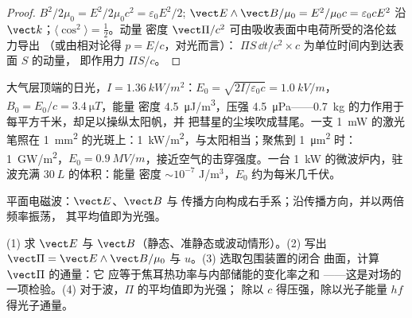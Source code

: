 \begin{proof}
$B^2/2\mu_0 = E^2/2\mu_0c^2 = \varepsilon_0E^2/2$; $\vect E\wedge\vect B/\mu_0 = E^2/\mu_0c =
\varepsilon_0cE^2$ 沿 $\vect k$；$\langle\cos^2\rangle = \tfrac12$。动量
密度 $\vect\Pi/c^2$ 可由吸收表面中电荷所受的洛伦兹力导出
（或由相对论得 $p = E/c$，对光而言）：
$\Pi S\,\dd t/c^2\times c$ 为单位时间内到达表面 $S$ 的动量，
即作用力 $\Pi S/c$。
\end{proof}

\begin{example}[日光、激光与微波]\label{ex:b2:poynting-vector:orders}
大气层顶端的日光，$I = \qty{1.36}{kW/m^2}$：$E_0 =
\sqrt{2I/\varepsilon_0c} = \qty{1.0}{kV/m}$，$B_0 = E_0/c = \qty{3.4}{\micro T}$，能量
密度 \qty{4.5}{\micro J/m^3}，压强 \qty{4.5}{\micro Pa}——\qty{0.7}{kg}
的力作用于每平方千米，却足以操纵太阳帆，并
把彗星的尘埃吹成彗尾。一支 \qty{1}{mW} 的激光笔照在
\qty{1}{mm^2} 的光斑上：\qty{1}{kW/m^2}，与太阳相当；聚焦到 \qty{1}{\micro m^2} 时：
\qty{1}{GW/m^2}，$E_0 = \qty{0.9}{MV/m}$，接近空气的击穿强度。一台
\qty{1}{kW} 的微波炉内，驻波充满 $\qty{30}{L}$ 的体积：能量
密度 $\sim 10^{-7}$ J/m$^3$，$E_0$ 约为每米几千伏。
\end{example}

\begin{omfigure}

{\small 平面电磁波：$\vect E$、$\vect B$ 与
传播方向构成右手系；沿传播方向，并以两倍频率振荡，
其平均值即为光强。}
\end{omfigure}

\begin{method}[能量核算]\label{met:b2:poynting-vector:method}
(1) 求 $\vect E$ 与 $\vect B$（静态、准静态或波动情形）。(2)
写出 $\vect\Pi = \vect E\wedge\vect B/\mu_0$ 与 $u$。(3) 选取包围装置的闭合
曲面，计算 $\vect\Pi$ 的通量：它
应等于焦耳热功率与内部储能的变化率之和
——这是对场的一项检验。(4) 对于波，$\Pi$ 的平均值即为光强；
除以 $c$ 得压强，除以光子能量
$hf$ 得光子通量。
\end{method}

